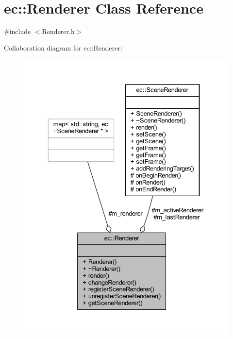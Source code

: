 \hypertarget{classec_1_1_renderer}{}\section{ec\+:\+:Renderer Class Reference}
\label{classec_1_1_renderer}


{\ttfamily \#include $<$Renderer.\+h$>$}



Collaboration diagram for ec\+:\+:Renderer\+:\nopagebreak
\begin{figure}[H]
\begin{center}
\leavevmode
\includegraphics[width=329pt]{classec_1_1_renderer__coll__graph}
\end{center}
\end{figure}
